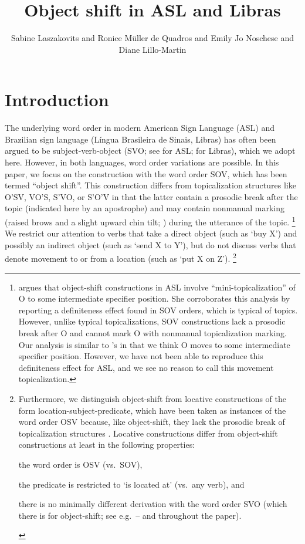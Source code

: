 \documentclass[output=paper,colorlinks,citecolor=brown,
]{langscibook}
\author{
    Sabine Laszakovits\affiliation{Austrian Academy of Sciences; University of Connecticut} and
    {Ronice Müller de} Quadros\affiliation{Universidade Federal de Santa Catarina} and 
    {Emily Jo} Noschese\affiliation{University of Hawai'i} and 
    Diane Lillo-Martin\affiliation{University of Connecticut; Haskins Laboratories}
}
\title{Object shift in ASL and Libras}
\begin{document}
\maketitle

\section{Introduction}
\label{lasz:sec:1}

The underlying word order in modern American Sign Language (ASL)
and Brazilian sign language (Língua Brasileira de Sinais, Libras) has
often been argued to be subject-verb-object (SVO; 
see \citealp{Fischer.1975,Liddell.1980,Padden.1988} for ASL; 
\citealp{Quadros.1999,Quadros.2003} for Libras), 
which we adopt here. However, in both languages, word order
variations are possible. In this paper, we focus on the construction with
the word order SOV, which has been termed ``object shift''. This
construction differs from topicalization structures like O'SV, VO'S,
S'VO, or S'O'V in that the latter contain a prosodic break after the
topic (indicated here by an apostrophe) and may contain nonmanual
marking (raised brows and a slight upward chin tilt; 
\citealp{Liddell.1977,Liddell.1980,Padden.1988}) during the utterance of the topic.%
\footnote{
    \citet{Fischer.1990} argues that object-shift constructions in ASL involve
    ``mini-topicalization'' of O to some intermediate specifier position. She corroborates
    this analysis by reporting a definiteness effect found in SOV orders, which is typical
    of topics. However, unlike typical topicalizations, SOV constructions lack a prosodic
    break after O and cannot mark O with nonmanual topicalization marking. Our
    analysis is similar to \citeauthor{Fischer.1990}'s in that we think O moves to some intermediate
    specifier position. However, we have not been able to reproduce this definiteness
    effect for ASL, and we see no reason to call this movement topicalization.
}
We restrict our attention to verbs that take a direct object (such as `buy X') and
possibly an indirect object (such as `send X to Y'), but do not discuss
verbs that denote movement to or from a location (such as `put X on Z').%
\footnote{
    Furthermore, we distinguish object-shift from locative constructions of the
    form location-subject-predicate, which have been taken as instances of the word
    order OSV because, like object-shift, they lack the prosodic break of topicalization
    structures \citep{Liddell.1980}. Locative constructions differ from object-shift
    constructions at least in the following properties: 
    \begin{inparaenum}[(i)]
        \item the word order is OSV (vs.~SOV),
        \item the predicate is restricted to `is located at' (vs.~any verb), and 
        \item there is no minimally different derivation with the word order SVO (which there is for
    object-shift; see e.g.~-- and throughout the paper).
    \end{inparaenum}
}
\end{document}
